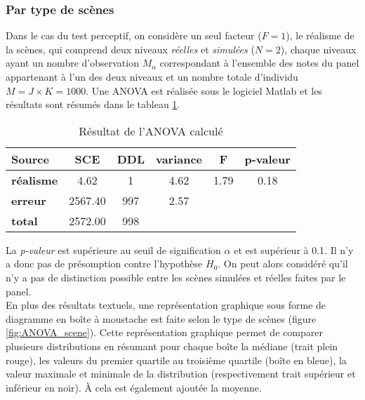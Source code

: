\subsubsection{Par type de scènes}

Dans le cas du test perceptif, on considère un seul facteur ($F = 1$), le réalisme de la scènes, qui comprend deux niveaux \textit{réelles} et \textit{simulées} ($N = 2$), chaque niveaux ayant un nombre d'observation $M_n$ correspondant à l'ensemble des notes du panel appartenant à l'un des deux niveaux et un nombre totale d'individu $M = J \times K = 1000$. Une ANOVA est réalisée sous le logiciel Matlab et les résultats sont résumés dans le tableau \ref{tab:anova}.\\

\begin{table}[ht]
\centering
\begin{tabular}{lccccc}
\hline
\textbf{Source}     & \textbf{SCE} & \textbf{DDL} & \textbf{variance} & \textbf{F} & \textbf{p-valeur} \\
\hline
\textbf{réalisme} & 4.62         & 1            & 4.62              & 1.79       & 0.18              \\
\hline
\textbf{erreur}      & 2567.40      & 997          & 2.57              &            &                   \\
\hline
\textbf{total}      & 2572.00         & 998          &                   &            &       \\
\hline
\end{tabular}
\caption{Résultat de l'ANOVA calculé}
\label{tab:anova}
\end{table}


La \textit{p-valeur} est supérieure au seuil de signification $\alpha$ et est supérieur à 0.1. Il n'y a donc pas de présomption contre l'hypothèse $H_0$. On peut alors considéré qu'il n'y a pas de distinction possible entre les scènes simulées et réelles faites par le panel. \\

En plus des résultats textuels, une représentation graphique sous forme de diagramme en boîte à moustache est faite selon le type de scènes (figure \ref{fig:ANOVA_scene}). Cette représentation graphique permet de comparer plusieurs distributions en résumant pour chaque boîte la médiane (trait plein rouge), les valeurs du  premier quartile au troisième quartile (boîte en bleue), la valeur maximale et minimale de la distribution (respectivement trait supérieur et inférieur en noir). \`A cela est également ajoutée la moyenne.\\

